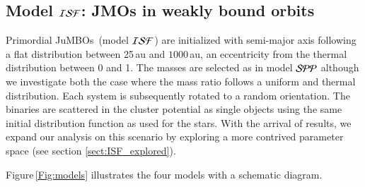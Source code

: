 \documentclass[submission,phys]{lib/SciPost}
\newcommand{\jumbos}{\mbox{JuMBOs}}
\begin{document}
\subsection{Model ${\cal ISF}$: JMOs in weakly bound orbits}

Primordial \jumbos\, (model ${\cal ISF}$) are initialized with
semi-major axis following a flat distribution between 25\,au and
$1000$\,au, an eccentricity from the thermal distribution between 0
and 1. The masses are selected as in model ${\cal SPP}$ although we investigate
both the case where the mass ratio follows a uniform and thermal distribution.  
Each system is subsequently rotated to a random orientation.  The binaries are 
scattered in the cluster potential as single objects using the same initial
distribution function as used for the stars. With the arrival of results,
we expand our analysis on this scenario by exploring a more contrived parameter
space (see section \ref{sect:ISF_explored}).


Figure\,\ref{Fig:models} illustrates the four models with a
schematic diagram.
\end{document}
